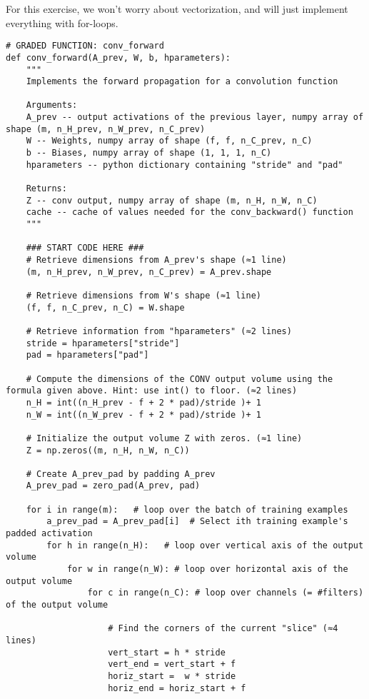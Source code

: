 {For this exercise, we won't worry about vectorization, and will just implement everything with for-loops.

\begin{verbatim}
# GRADED FUNCTION: conv_forward
def conv_forward(A_prev, W, b, hparameters):
    """
    Implements the forward propagation for a convolution function
    
    Arguments:
    A_prev -- output activations of the previous layer, numpy array of shape (m, n_H_prev, n_W_prev, n_C_prev)
    W -- Weights, numpy array of shape (f, f, n_C_prev, n_C)
    b -- Biases, numpy array of shape (1, 1, 1, n_C)
    hparameters -- python dictionary containing "stride" and "pad"
        
    Returns:
    Z -- conv output, numpy array of shape (m, n_H, n_W, n_C)
    cache -- cache of values needed for the conv_backward() function
    """
    
    ### START CODE HERE ###
    # Retrieve dimensions from A_prev's shape (≈1 line)  
    (m, n_H_prev, n_W_prev, n_C_prev) = A_prev.shape
    
    # Retrieve dimensions from W's shape (≈1 line)
    (f, f, n_C_prev, n_C) = W.shape
    
    # Retrieve information from "hparameters" (≈2 lines)
    stride = hparameters["stride"]
    pad = hparameters["pad"]
    
    # Compute the dimensions of the CONV output volume using the formula given above. Hint: use int() to floor. (≈2 lines)
    n_H = int((n_H_prev - f + 2 * pad)/stride )+ 1
    n_W = int((n_W_prev - f + 2 * pad)/stride )+ 1
    
    # Initialize the output volume Z with zeros. (≈1 line)
    Z = np.zeros((m, n_H, n_W, n_C))
    
    # Create A_prev_pad by padding A_prev
    A_prev_pad = zero_pad(A_prev, pad)
    
    for i in range(m):   # loop over the batch of training examples
        a_prev_pad = A_prev_pad[i]  # Select ith training example's padded activation
        for h in range(n_H):   # loop over vertical axis of the output volume
            for w in range(n_W): # loop over horizontal axis of the output volume
                for c in range(n_C): # loop over channels (= #filters) of the output volume
                    
                    # Find the corners of the current "slice" (≈4 lines)
                    vert_start = h * stride
                    vert_end = vert_start + f
                    horiz_start =  w * stride
                    horiz_end = horiz_start + f
                    

\end{verbatim}}

